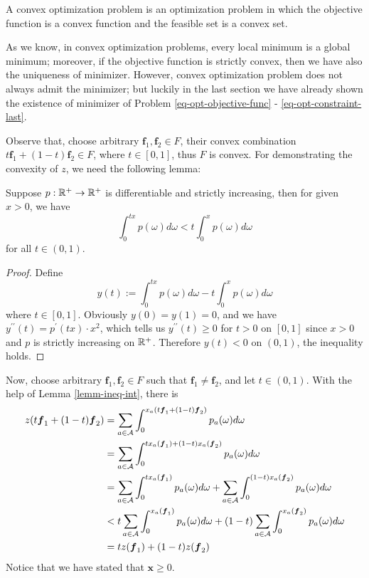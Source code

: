 \documentclass{article}
\begin{document}
\begin{defi}
    A convex optimization problem is an optimization problem in which the objective function is a convex function and the feasible set is a convex set.
\end{defi}

As we know, in convex optimization problems, every local minimum is a global minimum; moreover, if the objective function is strictly convex, then we have also the uniqueness of minimizer. However, convex optimization problem does not always admit the minimizer; but luckily in the last section we have already shown the existence of minimizer of Problem \ref{eq-opt-objective-func} - \ref{eq-opt-constraint-last}.

Observe that, choose arbitrary $ \boldsymbol{f}_1, \boldsymbol{f}_2 \in F $, their convex combination $ t \boldsymbol{f}_1 + (1-t) \boldsymbol{f}_2 \in F $, where $ t \in [0, 1] $, thus $ F $ is convex. For demonstrating the convexity of $ z $, we need the following lemma:

\begin{lemm} \label{lemm-ineq-int}
    Suppose $ p : \mathbb{R}^+ \rightarrow \mathbb{R}^+ $ is differentiable and strictly increasing, then for given $ x > 0 $, we have
    $$ \int_0^{tx} p (\omega) d \omega < t \int_0^x p (\omega) d \omega $$
    for all $ t \in (0, 1) $.
\end{lemm}
\begin{proof}
    Define 
    $$ y (t) := \int_0^{tx} p (\omega) d \omega - t \int_0^x p (\omega) d \omega $$
    where $ t \in [0, 1] $. Obviously $ y (0) = y (1) = 0 $, and we have $ y^{\prime\prime}(t) = p^\prime(tx) \cdot x^2 $, which tells us $ y^{\prime\prime}(t) \ge 0 $ for $ t > 0 $ on $ [0, 1] $ since $ x > 0 $ and $ p $ is strictly increasing on $ \mathbb{R}^+ $. Therefore $ y(t) < 0 $ on $ (0, 1) $, the inequality holds.
\end{proof}

Now, choose arbitrary $ \boldsymbol{f}_1, \boldsymbol{f}_2 \in F $ such that $ \boldsymbol{f}_1 \neq \boldsymbol{f}_2 $, and let $ t \in (0, 1) $. With the help of Lemma \ref{lemm-ineq-int}, there is
\begin{align}
    z (t \boldsymbol{f}_1 + (1-t) \boldsymbol{f}_2) &= \sum_{a \in \mathcal{A}} \int_0^{x_a (t \boldsymbol{f}_1 + (1-t) \boldsymbol{f}_2)} p_a (\omega) d \omega \\ 
    &= \sum_{a \in \mathcal{A}} \int_0^{t x_a (\boldsymbol{f}_1) + (1-t) x_a (\boldsymbol{f}_2)} p_a (\omega) d \omega \\
    &= \sum_{a \in \mathcal{A}} \int_0^{t x_a (\boldsymbol{f}_1)} p_a (\omega) d \omega + \sum_{a \in \mathcal{A}} \int_0^{(1-t) x_a (\boldsymbol{f}_2)} p_a (\omega) d \omega \\
    &<  t \sum_{a \in \mathcal{A}} \int_0^{x_a (\boldsymbol{f}_1)} p_a (\omega) d \omega + (1 - t) \sum_{a \in \mathcal{A}} \int_0^{x_a (\boldsymbol{f}_2)} p_a (\omega) d \omega \\ 
    &= t z(\boldsymbol{f}_1) + (1 - t) z (\boldsymbol{f}_2)
\end{align}
Notice that we have stated that $ \boldsymbol{x} \ge 0 $.
\end{document}
